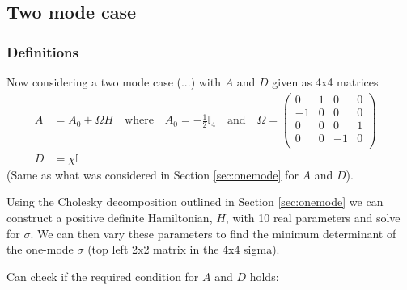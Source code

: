 \documentclass[11pt,a4paper]{article}
\numberwithin{equation}{section}
\begin{document}
	
	\subsection{Two mode case}
	\subsubsection{Definitions}
	Now considering a two mode case (...) with $A$ and $D$ given as 4x4 matrices
	\begin{align*}
	A &= A_0 + \Omega H \quad\text{where}\quad A_0 = -\frac{1}{2}\mathbb{I}_4\quad\text{and}\quad \Omega = \begin{pmatrix}
	0 & 1 & 0 & 0 \\
	-1 & 0 & 0 & 0\\
	0 & 0 & 0 & 1\\
	0 & 0 & -1 & 0\\
	\end{pmatrix} &\\
	D &= \chi \mathbb{I}&
	\end{align*} (Same as what was considered in Section \ref{sec:onemode} for $A$ and $D$).
	
	Using the Cholesky decomposition outlined in Section \ref{sec:onemode} we can construct a positive definite Hamiltonian, $H$, with 10 real parameters and solve for $\sigma$. We can then vary these parameters to find the minimum determinant of the one-mode $\sigma$ (top left 2x2 matrix in the 4x4 sigma). 
	
	Can check if the required condition for $A$ and $D$ holds:
\end{document}
